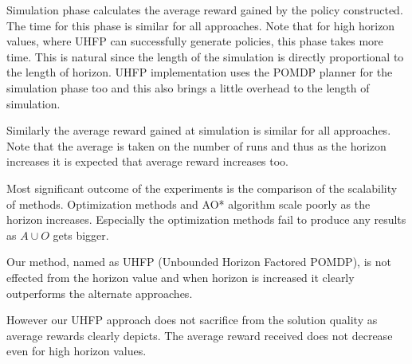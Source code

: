 Simulation phase calculates the average reward gained by the  policy constructed. The time for this phase is similar for all approaches. Note that for high horizon values, where \textsc{UHFP} can successfully generate policies, this phase takes more time. This is natural since the length of the simulation is directly proportional to the length of horizon. \textsc{UHFP} implementation uses the POMDP planner for the simulation phase too and this also brings a little overhead to the length of simulation.

Similarly the average reward gained at simulation is similar for all approaches. Note that the average is taken on the number of runs and thus as the horizon increases it is expected that average reward increases too. 

Most significant outcome of the experiments is the comparison of the scalability of methods. 
Optimization methods and AO* algorithm scale poorly as the horizon increases. Especially the optimization 
methods fail to produce any results as $A \cup O$ gets bigger.

Our method, named as \textsc{UHFP} (Unbounded Horizon Factored POMDP), is not effected from the horizon value and 
when horizon is increased it clearly outperforms the alternate approaches.

However our \textsc{UHFP} approach does not sacrifice from the solution quality as average rewards clearly depicts. The average reward received does not decrease even for high horizon values.

